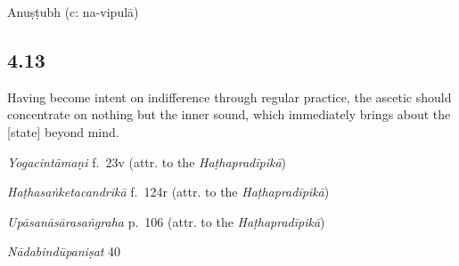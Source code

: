 \begin{ekdosis}
\begin{metre}[hp04_012]
Anuṣṭubh (c: na-vipulā)
\end{metre}

\subsection*{4.13}
\begin{translation}[hp04_013]
Having become intent on indifference through regular practice, the ascetic should concentrate on nothing but the inner sound, which immediately brings about the [state] beyond mind.%
\end{translation}


\begin{testimonia}[hp04_013]
\emph{Yogacintāmaṇi} f.~23v (attr. to the \emph{Haṭhapradīpikā})
\begin{versinnote}
\end{versinnote}

\emph{Haṭhasaṅketacandrikā} f.~124r (attr. to the \emph{Haṭhapradīpikā})
\begin{versinnote}
\tl{\var{evāvadhārayet ] emend., evaṃ vadhārayet ms. 2244}\\!}
\end{versinnote}

\emph{Upāsanāsārasaṅgraha} p.~106 (attr. to the \emph{Haṭhapradīpikā})
\begin{versinnote}
\end{versinnote}

\emph{Nādabindūpaniṣat} 40
\begin{versinnote}
\end{versinnote}


\end{testimonia}
\end{ekdosis}
